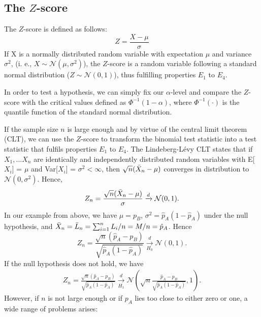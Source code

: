 \subsection{The \texorpdfstring{$Z$}{Z}-score}
\label{subsec:z-score}
The $Z$-score is defined as follows:
$$Z = \frac{X-\mu}{\sigma}$$
If X is a normally distributed random variable with expectation $\mu$ and variance $\sigma^2$, (i. e., $X \sim \mathcal{N}(\mu,\sigma^2)$), the $Z$-score is a random variable following a standard normal distribution ($Z \sim \mathcal{N}(0,1)$), thus fulfilling properties $E_1$ to $E_4$.\par
In order to test a hypothesis, we can simply fix our $\alpha$-level and compare the $Z$-score with the critical values defined as $\Phi^{-1}(1-\alpha)$, where $\Phi^{-1}(\cdot)$ is the quantile function of the standard normal distribution.\par %
If the sample size $n$ is large enough and by virtue of the central limit theorem (CLT), we can use the $Z$-score to transform the binomial test statistic into a test statistic that fulfils properties $E_1$ to $E_4$. The Lindeberg-Lévy CLT states that if $X_1, \dots X_n$ are identically and independently distributed random variables with E[$X_i$] = $\mu$ and Var[$X_i$] = $\sigma^2 < \infty$, then $\sqrt{n}(\Bar{X}_n-\mu)$ converges in distribution to $\mathcal{N}(0,\sigma^2)$. Hence, 
$$Z_n = \frac{\sqrt{n}(\Bar{X}_n-\mu)}{\sigma} \xrightarrow{d} \mathcal{N}(0,1).$$
In our example from above, we have $\mu = p_B$, $\sigma^2 = \hat{p}_A(1-\hat{p}_A)$ under the null hypothesis, and ${\Bar{X}_n = \Bar{L}_n = \sum_{i=1}^n L_i/n = M/n = \hat{p}_A}$. Hence $$Z_n = \frac{\sqrt{n}(\hat{p}_A-p_B)}{\sqrt{\hat{p}_A(1-\hat{p}_A)}} \xrightarrow[H_0]{d} \mathcal{N}(0,1).$$
If the null hypothesis does not hold, we have
\begin{align}
    Z_n = \frac{\sqrt{n}(\hat{p}_A-p_B)}{\sqrt{\hat{p}_A(1-\hat{p}_A)}} \xrightarrow[H_1]{d} \mathcal{N}(\sqrt{n}\frac{\hat{p}_A-p_B}{\sqrt{\hat{p}_A(1-\hat{p}_A)}},1). \label{eq:Zn_binom}
\end{align}
However, if $n$ is not large enough or if $p_A$ lies too close to either zero or one, a wide range of problems arises: 
